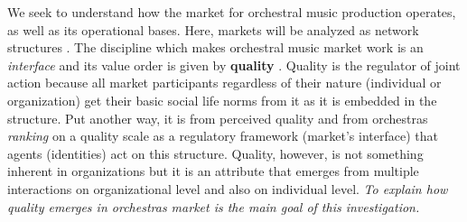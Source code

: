 \documentclass[a4paper, 12pt, openright, oneside, german, french, brazil, english]{abntex2}
\begin{document}
	
	We seek to understand how the market for orchestral music production operates, as well as its operational bases. Here, markets will be analyzed as network structures \cite{white2002markets}. The discipline which makes orchestral music market work is an \textit{interface} and its value order is given by \textbf{quality} \cite{white2002markets}. Quality is the regulator of joint action because all market participants regardless of their nature (individual or organization) get their basic social life norms from it as it is embedded in the structure. Put another way, it is from perceived quality and from orchestras \textit{ranking} on a quality scale as a regulatory framework (market's interface) that agents (identities) act on this structure. Quality, however, is not something inherent in organizations but it is an attribute that emerges from multiple interactions on organizational level and also on individual level. \textit{To explain how quality emerges in orchestras market is the main goal of this investigation.}
	
	
\end{document}
